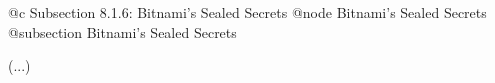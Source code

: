 @c Subsection 8.1.6: Bitnami's Sealed Secrets
@node Bitnami's Sealed Secrets
@subsection Bitnami's Sealed Secrets

(...)
